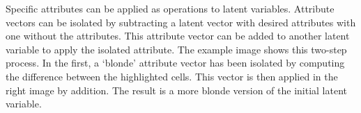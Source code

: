 \documentclass[letterpaper]{article}
\begin{document}
Specific attributes can be applied as operations to latent variables. Attribute vectors can be isolated by subtracting a latent vector with desired attributes with one without the attributes. This attribute vector can be added to another latent variable to apply the isolated attribute. The example image shows this two-step process. In the first, a ‘blonde’ attribute vector has been isolated by computing the difference between the highlighted cells. This vector is then applied in the right image by addition. The result is a more blonde version of the initial latent variable.
\end{document}
